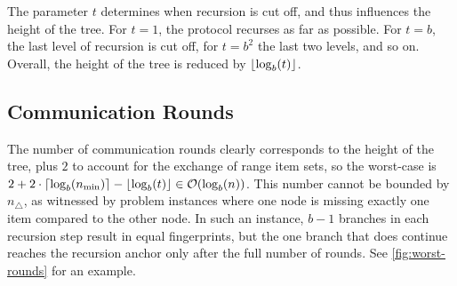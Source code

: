 The parameter $t$ determines when recursion is cut off, and thus influences the height of the tree. For $t = 1$, the protocol recurses as far as possible. For $t = b$, the last level of recursion is cut off, for $t = b^2$ the last two levels, and so on. Overall, the height of the tree is reduced by $\lfloor\log_{b}(t)\rfloor$.

\subsection{Communication Rounds}

The number of communication rounds clearly corresponds to the height of the tree, plus $2$ to account for the exchange of range item sets, so the worst-case is $2 + 2 \cdot\lceil\log_{b}(n_{\min})\rceil - \lfloor\log_{b}(t)\rfloor \in \mathcal{O}(\log_{b}(n))$. This number cannot be bounded by $n_{\triangle}$, as witnessed by problem instances where one node is missing exactly one item compared to the other node. In such an instance, $b - 1$ branches in each recursion step result in equal fingerprints, but the one branch that does continue reaches the recursion anchor only after the full number of rounds. See \cref{fig:worst-rounds} for an example.

